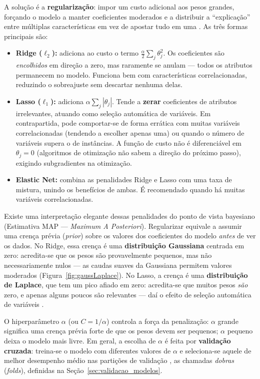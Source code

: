 A solução é a \textbf{regularização}: impor um custo adicional aos pesos grandes, forçando o modelo a manter coeficientes moderados e a distribuir a ``explicação'' entre múltiplas características em vez de apostar tudo em uma \citep{geron2019maos, Levada2026}. As três formas principais são:

\begin{itemize}
	\item \textbf{Ridge (\(\ell_2\)):} adiciona ao custo o termo \(\frac{\alpha}{2} \sum_j \theta_j^2\). Os coeficientes são \textit{encolhidos} em direção a zero, mas raramente se anulam --- todos os atributos permanecem no modelo. Funciona bem com características correlacionadas, reduzindo o sobreajuste sem descartar nenhuma delas.

	\item \textbf{Lasso (\(\ell_1\)):} adiciona \(\alpha \sum_j |\theta_j|\). Tende a \textbf{zerar} coeficientes de atributos irrelevantes, atuando como seleção automática de variáveis. Em contrapartida, pode comportar-se de forma errática com muitas variáveis correlacionadas (tendendo a escolher apenas uma) ou quando o número de variáveis supera o de instâncias. A função de custo não é diferenciável em \(\theta_j = 0\) (algoritmos de otimização não sabem a direção do próximo passo), exigindo subgradientes na otimização.

	\item \textbf{Elastic Net:} combina as penalidades Ridge e Lasso com uma taxa de mistura, unindo os benefícios de ambas. É recomendado quando há muitas variáveis correlacionadas.
\end{itemize}

Existe uma interpretação elegante dessas penalidades do ponto de vista bayesiano (Estimativa MAP --- \textit{Maximum A Posteriori}). Regularizar equivale a assumir uma crença prévia (\textit{prior}) sobre os valores dos coeficientes do modelo \emph{antes} de ver os dados. No Ridge, essa crença é uma \textbf{distribuição Gaussiana} centrada em zero: acredita-se que os pesos são provavelmente pequenos, mas não necessariamente nulos --- as caudas suaves da Gaussiana permitem valores moderados (Figura~\ref{fig:gaussLaplace}). No Lasso, a crença é uma \textbf{distribuição de Laplace}, que tem um pico afiado em zero: acredita-se que muitos pesos \emph{são} zero, e apenas alguns poucos são relevantes --- daí o efeito de seleção automática de variáveis \citep{geron2019maos, Levada2026}.

O hiperparâmetro \(\alpha\) (ou \(C = 1/\alpha\)) controla a força da penalização: \(\alpha\) grande significa uma crença prévia forte de que os pesos devem ser pequenos; \(\alpha\) pequeno deixa o modelo mais livre. Em geral, a escolha de \(\alpha\) é feita por \textbf{validação cruzada}: treina-se o modelo com diferentes valores de \(\alpha\) e seleciona-se aquele de melhor desempenho médio nas partições de validação \citep{geron2019maos}, as chamadas \emph{dobras} (\textit{folds}), definidas na Seção~\ref{sec:validacao_modelos}.

